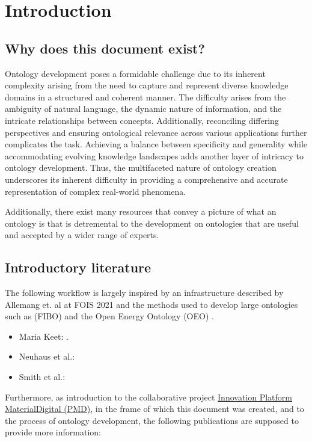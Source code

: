 \section{Introduction}

\subsection{Why does this document exist?}

Ontology development poses a formidable challenge due to its inherent complexity arising from the need to capture and represent diverse knowledge domains in a structured and coherent manner. The difficulty arises from the ambiguity of natural language, the dynamic nature of information, and the intricate relationships between concepts. Additionally, reconciling differing perspectives and ensuring ontological relevance across various applications further complicates the task. Achieving a balance between specificity and generality while accommodating evolving knowledge landscapes adds another layer of intricacy to ontology development. Thus, the multifaceted nature of ontology creation underscores its inherent difficulty in providing a comprehensive and accurate representation of complex real-world phenomena.

Additionally, there exist many resources that convey a picture of what an ontology is that is detremental to the development on ontologies that are useful and accepted by a wider range of experts. 

\subsection{Introductory literature}

The following workflow is largely inspired by an infrastructure described by Allemang et. al at FOIS 2021 \cite{kendall-workflow} and the methods used to develop large ontologies such as (FIBO) \cite{fibo2013} and the Open Energy Ontology (OEO) \cite{oeo2021}.

\begin{itemize}
    \item Maria Keet: \cite{keet2018introduction}.
    \item Neuhaus et al.: \cite{Neuhaus2022OntologyDI}
    \item Smith et al.: \cite{bfo-book}
\end{itemize}

Furthermore, as introduction to the collaborative project \href{http://www.materialdigital.de}{Innovation Platform MaterialDigital (PMD)}, in the frame of which this document was created, and to the process of ontology development, the following publications are supposed to provide more information: 


